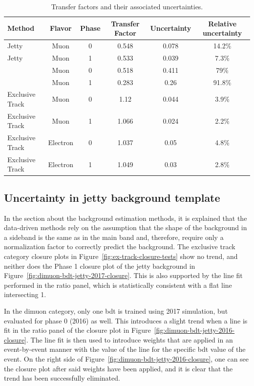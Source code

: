 \begin{table}[hp]
	\centering
	
		\caption{\label{tab:transfer-factors}Transfer factors and their associated uncertainties.}
			\begin{tabular}{lccccc} \hline
			Method & Flavor & Phase & Transfer Factor & Uncertainty & Relative uncertainty \\ \hline
			Jetty & Muon & 0 &  0.548 & 0.078 & 14.2\% \\
			Jetty & Muon & 1 &  0.533 & 0.039 & 7.3\% \\
			\tautau & Muon & 0 &  0.518 & 0.411 & 79\% \\
			\tautau & Muon & 1 &  0.283 & 0.26 & 91.8\% \\
			Exclusive Track & Muon & 0 & 1.12 & 0.044 & 3.9\% \\ 
			Exclusive Track & Muon & 1 & 1.066 & 0.024 & 2.2\% \\	
			Exclusive Track & Electron & 0 & 1.037 & 0.05 & 4.8\% \\	
			Exclusive Track & Electron & 1 & 1.049 & 0.03 & 2.8\% \\			
			
			\hline
			\end{tabular}
\end{table}

\subsection{Uncertainty in jetty background template}
\label{sec:data-driven-shape}

In the section about the background estimation methods, it is explained that the data-driven methods rely on the assumption that the shape of the background in a sideband is the same as in the main band and, therefore, require only a normalization factor to correctly predict the background. The exclusive track category closure plots in Figure~\ref{fig:ex-track-closure-tests} show no trend, and neither does the Phase 1 closure plot of the jetty background in Figure~\ref{fig:dimuon-bdt-jetty-2017-closure}. This is also supported by the line fit performed in the ratio panel, which is statistically consistent with a flat line intersecting 1.

In the dimuon category, only one \gls{bdt} is trained using 2017 simulation, but evaluated for phase 0 (2016) as well. This introduces a slight trend when a line is fit in the ratio panel of the closure plot in Figure~\ref{fig:dimuon-bdt-jetty-2016-closure}. The line fit is then used to introduce weights that are applied in an event-by-event manner with the value of the line for the specific \gls{bdt} value of the event. On the right side of Figure~\ref{fig:dimuon-bdt-jetty-2016-closure}, one can see the closure plot after said weights have been applied, and it is clear that the trend has been successfully eliminated.


